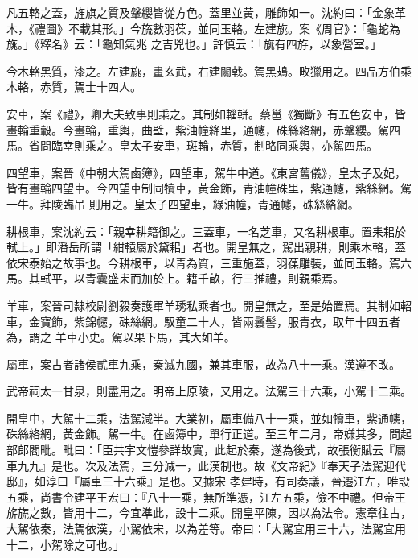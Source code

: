 \begin{pinyinscope}
 凡五輅之蓋，旌旗之質及鞶纓皆從方色。蓋里並黃，雕飾如一。沈約曰：「金象革木，《禮圖》不載其形。」今旒數羽葆，並同玉輅。左建旐。案《周官》：「龜蛇為旐。」《釋名》云：「龜知氣兆
 之吉兇也。」許慎云：「旐有四斿，以象營室。」



 今木輅黑質，漆之。左建旐，畫玄武，右建闟戟。駕黑鳷。畋獵用之。四品方伯乘木輅，赤質，駕士十四人。



 安車，案《禮》，卿大夫致事則乘之。其制如輜軿。蔡邕《獨斷》有五色安車，皆畫輪重轂。今畫輪，重輿，曲壁，紫油幢絳里，通幰，硃絲絡網，赤鞶纓。駕四馬。省問臨幸則乘之。皇太子安車，斑輪，赤質，制略同乘輿，亦駕四馬。



 四望車，案晉《中朝大駕鹵簿》，四望車，駕牛中道。《東宮舊儀》，皇太子及妃，皆有畫輪四望車。今四望車制同犢車，黃金飾，青油幢硃里，紫通幰，紫絲網。駕一牛。拜陵臨吊
 則用之。皇太子四望車，綠油幢，青通幰，硃絲絡網。



 耕根車，案沈約云：「親幸耕籍御之。三蓋車，一名芝車，又名耕根車。置耒耜於軾上。」即潘岳所謂「紺轅屬於黛耜」者也。開皇無之，駕出親耕，則乘木輅，蓋依宋泰始之故事也。今耕根車，以青為質，三重施蓋，羽葆雕裝，並同玉輅。駕六馬。其軾平，以青囊盛耒而加於上。籍千畝，行三推禮，則親乘焉。



 羊車，案晉司隸校尉劉毅奏護軍羊琇私乘者也。開皇無之，至是始置焉。其制如軺車，金寶飾，紫錦幰，硃絲網。馭童二十人，皆兩鬟髻，服青衣，取年十四五者為，謂之
 羊車小史。駕以果下馬，其大如羊。



 屬車，案古者諸侯貳車九乘，秦滅九國，兼其車服，故為八十一乘。漢遵不改。



 武帝祠太一甘泉，則盡用之。明帝上原陵，又用之。法駕三十六乘，小駕十二乘。



 開皇中，大駕十二乘，法駕減半。大業初，屬車備八十一乘，並如犢車，紫通幰，硃絲絡網，黃金飾。駕一牛。在鹵簿中，單行正道。至三年二月，帝嫌其多，問起部郎閻毗。毗曰：「臣共宇文愷參詳故實，此起於秦，遂為後式，故張衡賦云『屬車九九』是也。次及法駕，三分減一，此漢制也。故《文帝紀》『奉天子法駕迎代邸』，如淳曰『屬車三十六乘』是也。又據宋
 孝建時，有司奏議，晉遷江左，唯設五乘，尚書令建平王宏曰：『八十一乘，無所準憑，江左五乘，儉不中禮。但帝王旂旒之數，皆用十二，今宜準此，設十二乘。開皇平陳，因以為法令。憲章往古，大駕依秦，法駕依漢，小駕依宋，以為差等。帝曰：「大駕宜用三十六，法駕宜用十二，小駕除之可也。」




\end{pinyinscope}
